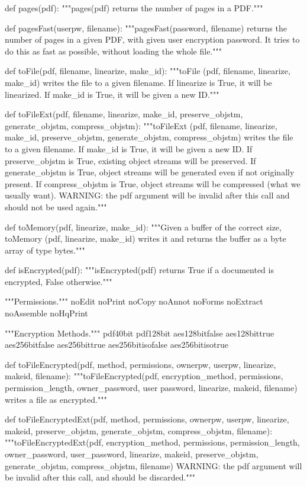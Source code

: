 def pages(pdf):
    """pages(pdf) returns the number of pages in a PDF."""

def pagesFast(userpw, filename):
    """pagesFast(password, filename) returns the number of pages in a given
    PDF, with given user encryption password. It tries to do this as fast as
    possible, without loading the whole file."""

def toFile(pdf, filename, linearize, make_id):
    """toFile (pdf, filename, linearize, make_id) writes the file to a given
    filename. If linearize is True, it will be linearized. If make_id is True,
    it will be given a new ID."""

def toFileExt(pdf, filename, linearize, make_id, preserve_objstm,
              generate_objstm, compress_objstm):
    """toFileExt (pdf, filename, linearize, make_id, preserve_objstm,
    generate_objstm, compress_objstm) writes the file to a given filename. If
    make_id is True, it will be given a new ID.  If preserve_objstm is True,
    existing object streams will be preserved. If generate_objstm is True,
    object streams will be generated even if not originally present. If
    compress_objstm is True, object streams will be compressed (what we usually
    want). WARNING: the pdf argument will be invalid after this call and should
    not be used again."""

def toMemory(pdf, linearize, make_id):
    """Given a buffer of the correct size, toMemory (pdf, linearize,
    make_id) writes it and returns the buffer as a byte array of type bytes."""

def isEncrypted(pdf):
    """isEncrypted(pdf) returns True if a documented is encrypted, False
    otherwise."""

"""Permissions."""
noEdit
noPrint
noCopy
noAnnot
noForms
noExtract
noAssemble
noHqPrint

"""Encryption Methods."""
pdf40bit
pdf128bit
aes128bitfalse
aes128bittrue
aes256bitfalse
aes256bittrue
aes256bitisofalse
aes256bitisotrue

def toFileEncrypted(pdf, method, permissions, ownerpw, userpw, linearize,
                    makeid, filename):
    """toFileEncrypted(pdf, encryption_method, permissions, permission_length,
    owner_password, user password, linearize, makeid, filename) writes a file
    as encrypted."""

def toFileEncryptedExt(pdf, method, permissions, ownerpw, userpw, linearize,
                       makeid, preserve_objstm, generate_objstm,
                       compress_objstm, filename):
    """toFileEncryptedExt(pdf, encryption_method, permissions,
    permission_length, owner_password, user_password, linearize, makeid,
    preserve_objstm, generate_objstm, compress_objstm, filename) WARNING: the
    pdf argument will be invalid after this call, and should be discarded."""

